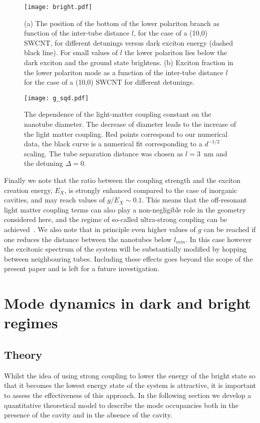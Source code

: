 \documentclass[journal=aamick,manuscript=article]{achemso}
\begin{document}
%
\begin{figure}
  \centering
  \texttt{[image: bright.pdf]}
  \caption{(a) The position of the bottom of the lower polariton branch as function of the inter-tube distance $l$, for the case of a (10,0) SWCNT, for different detunings versus dark exciton energy (dashed black line). For small values of $l$ the lower polariton lies below the dark exciton and the ground state brightens. (b) Exciton fraction in the lower polariton mode as a function of the inter-tube distance $l$ for the case of a (10,0) SWCNT for different detunings.}
  \label{bright}
\end{figure}
%

%
\begin{figure}
  \centering
  \texttt{[image: g\_sqd.pdf]}
  \caption{The dependence of the light-matter coupling constant on the nanotube diameter. The decrease of diameter leads to the increase of the light matter coupling. Red points correspond to our numerical data, the black curve is a numerical fit corresponding to a $d^{-1/2}$ scaling. The tube separation distance was chosen as $l=3$~nm and the detuning $\Delta=0$.}
  \label{g_d}
\end{figure}
%

Finally we note that the ratio between the coupling strength and the exciton creation energy, $E_X$, is strongly enhanced compared to the case of inorganic cavities, and may reach values of $g/E_X \sim 0.1$.
This means that the off-resonant light matter coupling terms can also play a non-negligible role in the geometry considered here, and the regime of so-called ultra-strong coupling can be achieved~\cite{Ciuti2005,Liberato2014}.
We also note that in principle even higher values of $g$ can be reached if one reduces the distance between the nanotubes below $l_{min}$.
In this case however the excitonic spectrum of the system will  be substantially modified by hopping between neighbouring tubes.
Including these effects goes beyond the scope of the present paper and is left for a future investigation.




\section*{Mode dynamics in dark and bright regimes}

\subsection*{Theory}
Whilst the idea of using strong coupling to lower the energy of the bright state so that it becomes the lowest energy state of the system is attractive, it is important to assess the effectiveness of this approach. 
In the following section we develop a quantitative theoretical model to describe the mode occupancies both in the presence of the cavity and in the absence of the cavity.
\end{document}

